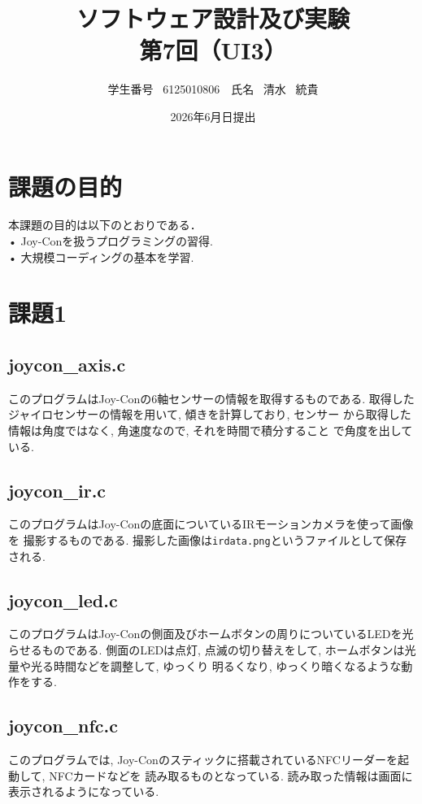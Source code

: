 \documentclass[dvipdfmx]{jsarticle}
\title{ソフトウェア設計及び実験\\第7回（UI3）}
\author{学生番号 \ 6125010806　氏名 \ 清水 \ 統貴}
\date{2026年6月日提出}
\begin{document}
\maketitle

\section{課題の目的}
%
本課題の目的は以下のとおりである．\\
• Joy-Conを扱うプログラミングの習得.\\
• 大規模コーディングの基本を学習.\\


\section{課題1}
%
\subsection{joycon\_axis.c}
%
このプログラムはJoy-Conの6軸センサーの情報を取得するものである. 
取得したジャイロセンサーの情報を用いて, 傾きを計算しており, センサー
から取得した情報は角度ではなく, 角速度なので, それを時間で積分すること
で角度を出している.\\
\subsection{joycon\_ir.c}
%
このプログラムはJoy-Conの底面についているIRモーションカメラを使って画像を
撮影するものである. 撮影した画像は\verb+irdata.png+というファイルとして保存
される.\\
\subsection{joycon\_led.c}
%
このプログラムはJoy-Conの側面及びホームボタンの周りについているLEDを光らせるものである. 
側面のLEDは点灯, 点滅の切り替えをして, ホームボタンは光量や光る時間などを調整して, ゆっくり
明るくなり, ゆっくり暗くなるような動作をする.\\
\subsection{joycon\_nfc.c}
%
このプログラムでは, Joy-Conのスティックに搭載されているNFCリーダーを起動して, NFCカードなどを
読み取るものとなっている. 読み取った情報は画面に表示されるようになっている.\\
\end{document}
